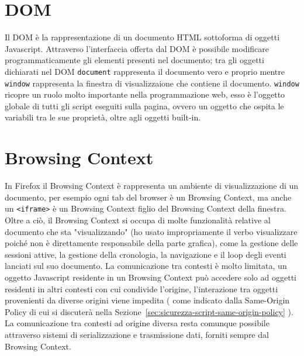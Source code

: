 \documentclass{sapthesis}
\newcommand{\code}[1]{\texttt{#1}}
\newcommand{\refSection}[1]{Sezione~\ref{#1}}
\newcommand{\JS}{Javascript}
\newcommand{\tagHTML}[1]{\code{<#1>}}
\newcommand{\iframe}{\tagHTML{iframe}}
\begin{document}
    \section{DOM}
    \label{sec:dom}
        Il DOM è la rappresentazione di un documento HTML sottoforma di oggetti \JS \cite{dom-introduction}. 
        Attraverso l'interfaccia offerta dal DOM è possibile modificare programmaticamente gli elementi presenti
        nel documento; tra gli oggetti dichiarati nel DOM \code{document} rappresenta il documento vero e proprio
        mentre \code{window} rappresenta la finestra di visualizzaione che contiene il documento.
        \code{window} ricopre un ruolo molto importante nella programmazione web, esso è l'oggetto globale 
        di tutti gli script eseguiti sulla pagina, ovvero un oggetto che ospita le variabili tra le
        sue proprietà, oltre agli oggetti built-in.

    \section{Browsing Context}
    \label{sec:browsing-context}
        In Firefox il Browsing Context è rappresenta un ambiente di visualizzazione di un documento,
        per esempio ogni tab del browser è un Browsing Context, ma anche un \iframe{} è un Browsing Context
        figlio del Browsing Context della finestra.
        Oltre a ciò, il Browsing Context si occupa di molte funzionalità relative al documento che sta
        "visualizzando" (ho usato impropriamente il verbo visualizzare poiché non è direttamente responsabile
        della parte grafica), come la gestione delle sessioni attive, la gestione della cronologia, la navigazione
        e il loop degli eventi lanciati sul suo documento. La comunicazione tra contesti è molto limitata, un oggetto \JS{}
        residente in un Browsing Context può accedere solo ad oggetti residenti in altri contesti con cui condivide
        l'origine, l'interazione tra oggetti provenienti da diverse origini viene impedita
        ( come indicato dalla Same-Origin Policy di cui si discuterà nella \refSection{sec:sicurezza-script-same-origin-policy} ).
        La comunicazione tra contesti ad origine diversa resta comunque possibile attraverso sistemi di
        serializzazione e trasmissione dati, forniti sempre dal Browsing Context.
\end{document}
